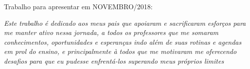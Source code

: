 \documentclass[	12pt, Times, openright, twoside, a4paper, english, brazil]{abntex2}
\begin{document}
    \begin{folhadeaprovacao}
      \begin{center}
        {\ABNTEXchapterfont\large\imprimirautor}

        \vspace*{\fill}\vspace*{\fill}
        {\ABNTEXchapterfont\bfseries\Large\imprimirtitulo}
        \vspace*{\fill}
        
        \hspace{.45\textwidth}
        \begin{minipage}{.5\textwidth}
            \imprimirpreambulo
        \end{minipage}%
        \vspace*{\fill}
       \end{center}
        
       Trabalho para apresentar em NOVEMBRO/2018:

          
       \begin{center}
        \vspace*{0.5cm}
        {\large\imprimirlocal}
        \par
        {\large\imprimirdata}
        \vspace*{1cm}
      \end{center}
      
    \end{folhadeaprovacao}

    \begin{dedicatoria}
       \vspace*{\fill}
       \centering
       \noindent
       \textit{ Este trabalho é dedicado aos meus pais que apoiaram e sacrificaram esforços para me manter ativo nessa jornada, a todos os professores que me somaram conhecimentos, oportunidades e esperanças indo além de suas rotinas e agendas em prol do ensino, e principalmente à todos que me motivaram me oferecendo desafios para que eu pudesse enfrentá-los superando meus próprios limites } \vspace*{\fill}
    \end{dedicatoria}
\end{document}
